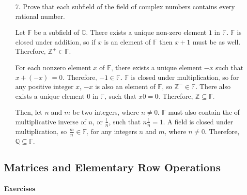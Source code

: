\documentclass{article}
\begin{document}
\begin{enumerate}[listparindent=\parindent]
\item[7.] Prove that each subfield of the field of complex numbers contains every rational number.

Let \(\mathbb F\) be a subfield of \(\mathbb C\).
There exists a unique non-zero element \(1\) in \(\mathbb F\).
\(\mathbb F\) is closed under addition, so if \(x\) is an element of \(\mathbb F\) then \(x + 1\) must be as well.
Therefore, \(\mathbb Z^+ \in \mathbb F\).

For each nonzero element \(x\) of \(\mathbb F\), there exists a unique element \(-x\) such that \(x + (-x)\ = 0\).
Therefore, \(-1 \in \mathbb F\).
\(\mathbb F\) is closed under multiplication, so for any positive integer \(x\), \(-x\) is also an element of \(\mathbb F\),
so \(\mathbb Z^- \in \mathbb F\).
There also exists a unique element \(0\) in \(\mathbb F\), such that \(x0 = 0\).
Therefore, \(\mathbb Z \subseteq \mathbb F\).

Then, let \(n\) and \(m\) be two integers, where \(n \neq 0\).
\(\mathbb F\) must also contain the of multiplicative inverse of \(n\), or \(\frac{1}{n}\), such that \(n\frac{1}{n} = 1\).
A field is closed under multiplication, so \(\frac{m}{n} \in \mathbb F\),
for any integers \(n\) and \(m\), where \(n \neq 0\).
Therefore, \(\mathbb Q \subseteq \mathbb F\).

\end{enumerate}

\subsection{Matrices and Elementary Row Operations}
\paragraph{Exercises}
\end{document}
